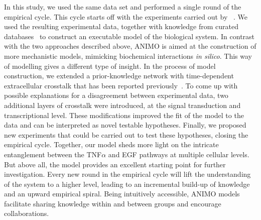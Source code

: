 In this study, we used the same data set and performed a single round of the empirical cycle. This cycle starts off with the experiments carried out by ~\citet{pathway-compendium}. We used the resulting experimental data, together with knowledge from curated databases~\citep{kegg,phosphosite} to construct an executable model of the biological system.
In contrast with the two approaches described above, ANIMO is aimed at the construction of
more mechanistic models, mimicking biochemical interactions \emph{in silico}. This way of modelling
gives a different type of insight. In the process of model construction, we extended a
prior-knowledge network with time-dependent extracellular crosstalk that has been reported
previously~\citep{pathway-autocrine}. To come up with possible explanations for a disagreement
between experimental data, two additional layers of
crosstalk were introduced, at the signal transduction and transcriptional level. These modifications 
improved the fit of the model to the data and can be interpreted as novel testable hypotheses.
Finally, we proposed new experiments that could be carried out to test these hypotheses, closing the empirical cycle. 
Together, our model sheds more light on the intricate
entanglement between the TNF$\alpha$ and EGF pathways at multiple cellular levels.
But above all,  the model provides an excellent starting point for further investigation.
Every new round in the empirical cycle will lift the understanding of the system to a higher level, leading to an incremental build-up of knowledge and an upward empirical spiral. Being intuitively accessible, ANIMO models facilitate sharing knowledge within and between groups and encourage collaborations.
